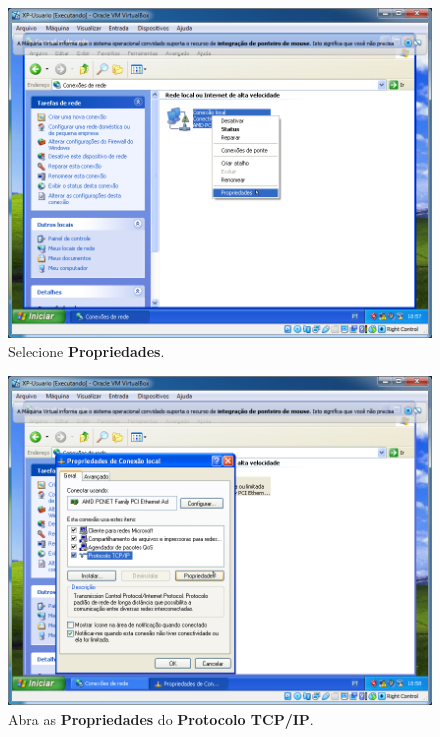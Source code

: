 \documentclass[10pt]{article}
\begin{document}
\begin{figure}[H]
    \centering
    \caption{Selecione \textbf{Propriedades}.}
    \label{fig:4132}
    \includegraphics[width=\linewidth]{images/xp_rede/014.png}
\end{figure}

\begin{figure}[H]
    \centering
    \caption{Abra as \textbf{Propriedades} do \textbf{Protocolo TCP/IP}.}
    \label{fig:4133}
    \includegraphics[width=\linewidth]{images/xp_rede/015.png}
\end{figure}
\end{document}

